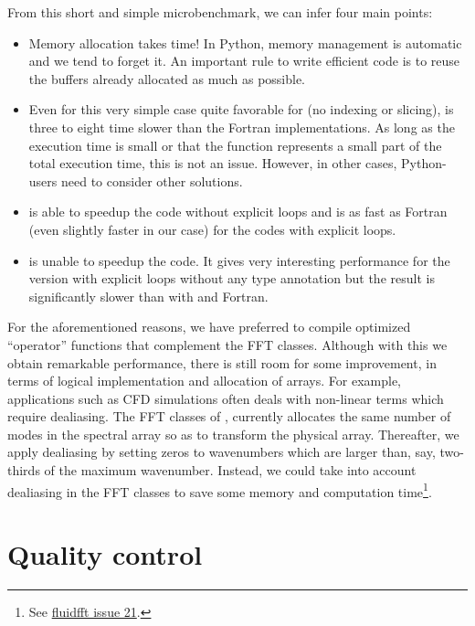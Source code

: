From this short and simple microbenchmark, we can infer four main points:
\begin{itemize}
\item Memory allocation takes time!  In Python, memory management is automatic
and we tend to forget it.  An important rule to write efficient code is to
reuse the buffers already allocated as much as possible.

\item Even for this very simple case quite favorable for  (no indexing
or slicing),  is three to eight time slower than the Fortran
implementations. As long as the execution time is small or that the
function represents a small part of the total execution time, this is not an
issue. However, in other cases, Python- users need to consider
other solutions.

\item {} is able to speedup the  code without explicit
loops and is as fast as Fortran (even slightly faster in our case) for the
codes with explicit loops.

\item {} is unable to speedup the  code.
%
It gives very interesting performance for the version with explicit loops
without any type annotation but the result is significantly slower than with
 and Fortran.
\end{itemize}

For the aforementioned reasons, we have preferred  to compile
optimized ``operator'' functions that complement the FFT classes. Although with
this we obtain remarkable performance, there is still room for some
improvement, in terms of logical implementation and allocation of arrays. For
example, applications such as CFD simulations often deals with non-linear terms
which require dealiasing. The FFT classes of , currently
allocates the same number of modes in the spectral array so as to transform the
physical array. Thereafter, we apply dealiasing by setting zeros to wavenumbers
which are larger than, say, two-thirds of the maximum wavenumber. Instead, we
could take into account dealiasing in the FFT classes to save some memory and
computation time\footnote{See
\href{https://bitbucket.org/fluiddyn/fluidfft/issues/21/}{fluidfft issue 21}.}.

\section{Quality control}

